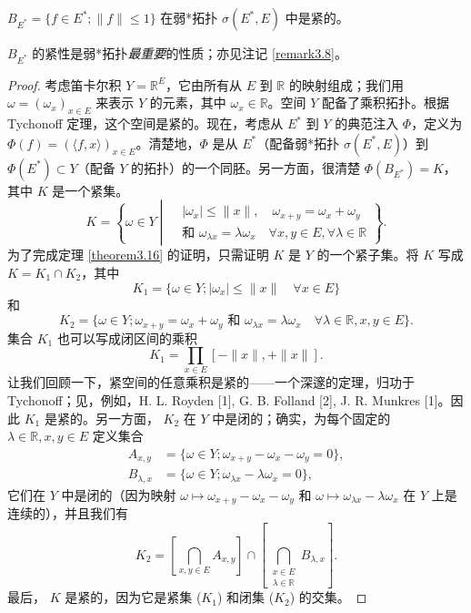\begin{theorem}\label{theorem3.16}
$B_{E^*} = \{f \in E^*; \|f\| \le 1\}$ 在弱*拓扑 $\sigma(E^*, E)$ 中是紧的。
\end{theorem}

\begin{remark}\label{remark3.12}
$B_{E^*}$ 的紧性是弱*拓扑\textit{最重要}的性质；亦见注记 \ref{remark3.8}。
\end{remark}

\begin{proof}
考虑笛卡尔积 $Y = \mathbb{R}^E$，它由所有从 $E$ 到 $\mathbb{R}$ 的映射组成；我们用 $\omega = (\omega_x)_{x \in E}$ 来表示 $Y$ 的元素，其中 $\omega_x \in \mathbb{R}$。空间 $Y$ 配备了乘积拓扑。根据 Tychonoff 定理，这个空间是紧的。现在，考虑从 $E^*$ 到 $Y$ 的典范注入 $\Phi$，定义为 $\Phi(f) = (\langle f, x \rangle)_{x \in E}$。清楚地，$\Phi$ 是从 $E^*$（配备弱*拓扑 $\sigma(E^*, E)$）到 $\Phi(E^*) \subset Y$（配备 $Y$ 的拓扑）的一个同胚。另一方面，很清楚 $\Phi(B_{E^*}) = K$，其中 $K$ 是一个紧集。
\[
K = \left\{ \omega \in Y \middle| 
\begin{aligned}
&|\omega_x| \le \|x\|, \quad \omega_{x+y} = \omega_x + \omega_y \\
&\text{和 } \omega_{\lambda x} = \lambda \omega_x \quad \forall x, y \in E, \forall \lambda \in \mathbb{R}
\end{aligned}
\right\}.
\]
为了完成定理 \ref{theorem3.16} 的证明，只需证明 $K$ 是 $Y$ 的一个紧子集。将 $K$ 写成 $K=K_1 \cap K_2$，其中
\[ K_1 = \{\omega \in Y; |\omega_x| \le \|x\| \quad \forall x \in E\} \]
和
\[ K_2 = \{\omega \in Y; \omega_{x+y} = \omega_x + \omega_y \text{ 和 } \omega_{\lambda x} = \lambda \omega_x \quad \forall \lambda \in \mathbb{R}, x, y \in E \}. \]
集合 $K_1$ 也可以写成闭区间的乘积
\[ K_1 = \prod_{x \in E} [-\|x\|, +\|x\|]. \]
让我们回顾一下，紧空间的任意乘积是紧的——一个深邃的定理，归功于 Tychonoff；见，例如，H. L. Royden [1], G. B. Folland [2], J. R. Munkres [1]。因此 $K_1$ 是紧的。另一方面， $K_2$ 在 $Y$ 中是闭的；确实，为每个固定的 $\lambda \in \mathbb{R}, x, y \in E$ 定义集合
\begin{align*}
    A_{x,y} &= \{\omega \in Y; \omega_{x+y} - \omega_x - \omega_y = 0\}, \\
    B_{\lambda,x} &= \{\omega \in Y; \omega_{\lambda x} - \lambda\omega_x = 0\},
\end{align*}
它们在 $Y$ 中是闭的（因为映射 $\omega \mapsto \omega_{x+y} - \omega_x - \omega_y$ 和 $\omega \mapsto \omega_{\lambda x} - \lambda\omega_x$ 在 $Y$ 上是连续的），并且我们有
\[ K_2 = \left[ \bigcap_{x,y \in E} A_{x,y} \right] \cap \left[ \bigcap_{\substack{x \in E \\ \lambda \in \mathbb{R}}} B_{\lambda,x} \right]. \]
最后， $K$ 是紧的，因为它是紧集 ($K_1$) 和闭集 ($K_2$) 的交集。
\end{proof}

